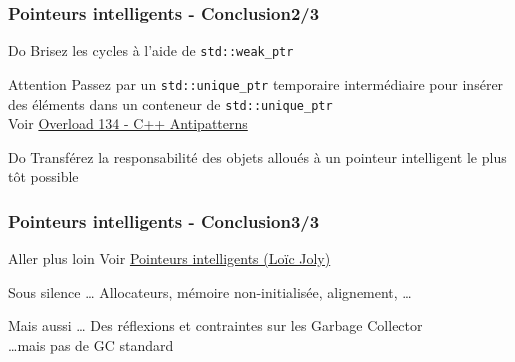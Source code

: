 \documentclass[C++.tex]{subfiles}
\begin{document}
\begin{frame}[fragile]
	\frametitle{Pointeurs intelligents - Conclusion\titlehfill{}2/3}
	\begin{exampleblock}{Do}
		Brisez les cycles à l'aide de \lstinline|std::weak_ptr|
	\end{exampleblock}

	\begin{alertblock}{Attention}
		Passez par un \lstinline|std::unique_ptr| temporaire intermédiaire pour insérer des éléments dans un conteneur de \lstinline|std::unique_ptr| \\
		Voir \href{https://accu.org/index.php/journals/2271}{Overload 134 - C++ Antipatterns}

	\end{alertblock}

	\begin{exampleblock}{Do}
		Transférez la responsabilité des objets alloués à un pointeur intelligent le plus tôt possible
	\end{exampleblock}
\end{frame}

\begin{frame}[fragile]
	\frametitle{Pointeurs intelligents - Conclusion\titlehfill{}3/3}
	\begin{block}{Aller plus loin}
		Voir \href{http://loic-joly.developpez.com/tutoriels/cpp/smart-pointers/}{Pointeurs intelligents (Loïc Joly)}
	\end{block}

	\begin{block}{Sous silence \ldots}
		Allocateurs, mémoire non-initialisée, alignement, \ldots 

	\end{block}

	\begin{block}{Mais aussi \ldots}
		Des réflexions et contraintes sur les Garbage Collector\\
		\ldots{}mais pas de GC standard
	\end{block}
\end{frame}
\end{document}

